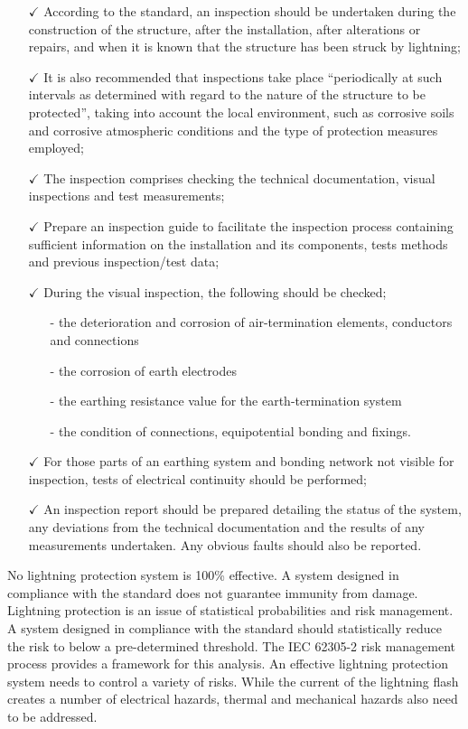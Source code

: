\begin{itemize}%
	\item [$\checkmark$] According to the standard, an inspection should be undertaken during the construction of the structure, after the installation, after alterations or repairs, and when it is known that the structure has been struck by lightning;
	\item [$\checkmark$] It is also recommended that inspections take place “periodically at such intervals as determined with regard to the nature of the structure to be protected”, taking into account the local environment, such as corrosive soils and corrosive atmospheric conditions and the type of protection measures employed;
	\item [$\checkmark$]The inspection comprises checking the technical documentation, visual inspections and test measurements;
	\item [$\checkmark$]Prepare an inspection guide to facilitate the inspection process containing sufficient information on the installation and its components, tests methods and previous inspection/test data;	
	\item [$\checkmark$]During the visual inspection, the following should be checked;	
	\begin{itemize}
		\item [-] the deterioration and corrosion of air-termination elements, conductors and connections
		\item [-]	the corrosion of earth electrodes
		\item [-]	the earthing resistance value for the earth-termination system
		\item [-]	the condition of connections, equipotential bonding and fixings.
		
	\end{itemize}
	
	\item [$\checkmark$] For those parts of an earthing system and bonding network not visible for inspection, tests of electrical continuity should be performed;
	
	\item [$\checkmark$] An inspection report should be prepared detailing the status of the system, any deviations from the technical documentation and the results of any measurements undertaken. Any obvious faults should also be reported.
\end{itemize}

No lightning protection system is 100\% effective. A system designed in compliance with the standard does not guarantee immunity from damage. Lightning protection is an issue of statistical probabilities and risk management. A system designed in compliance with the standard should statistically reduce the risk to below a pre-determined threshold. The IEC 62305-2 risk management process provides a framework for this analysis. An effective lightning protection system needs to control a variety of risks. While the current of the lightning flash creates a number of electrical hazards, thermal and mechanical hazards also need to be addressed. 

